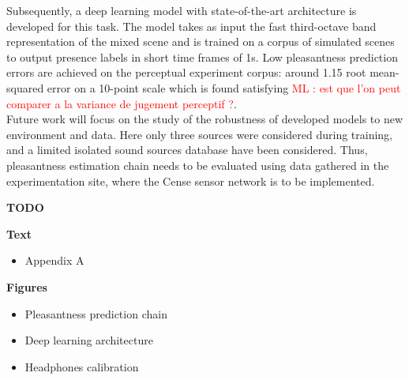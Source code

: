 \documentclass[11pt,a4paper]{article}
\newcommand{\ml}[1]{\textcolor{red}{ML : #1}}
\begin{document}
Subsequently, a deep learning model with state-of-the-art architecture is developed for this task. The model takes as input the fast third-octave band representation of the mixed scene and is trained on a corpus of simulated scenes to output presence labels in short time frames of 1s. Low pleasantness prediction errors are achieved on the perceptual experiment corpus: around 1.15 root mean-squared error on a 10-point scale which is found satisfying \ml{est que l'on peut comparer a la variance de jugement perceptif ?}.\\

Future work will focus on the study of the robustness of developed models to new environment and data. Here only three sources were considered during training, and a limited isolated sound sources database have been considered. Thus, pleasantness estimation chain needs to be evaluated using data gathered in the experimentation site, where the Cense sensor network is to be implemented. %

\clearpage

\textbf{TODO}


\textbf{Text}

\begin{itemize}
\item Appendix A
\end{itemize}

\textbf{Figures}

\begin{itemize}
\item Pleasantness prediction chain
\item Deep learning architecture
\item Headphones calibration
\end{itemize}

\clearpage










\end{document}
